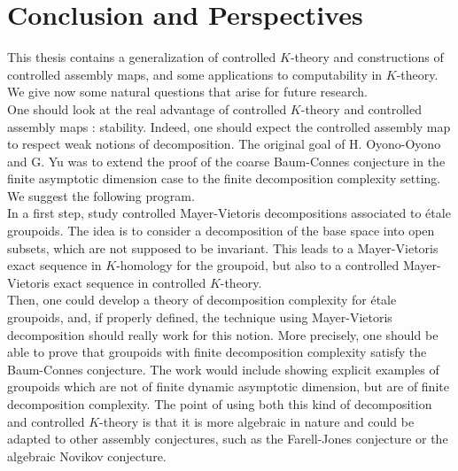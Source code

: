 \chapter{Conclusion and Perspectives}

This thesis contains a generalization of controlled $K$-theory and constructions of controlled assembly maps, and some applications to computability in $K$-theory. We give now some natural questions that arise for future research.\\ 

One should look at the real advantage of controlled $K$-theory and controlled assembly maps : stability. Indeed, one should expect the controlled assembly map to respect weak notions of decomposition. The original goal of H. Oyono-Oyono and G. Yu was to extend the proof of the coarse Baum-Connes conjecture in the finite asymptotic dimension case to the finite decomposition complexity setting. We suggest the following program.\\
 

In a first step, study controlled Mayer-Vietoris decompositions associated to étale groupoids. The idea is to consider a decomposition of the base space into open subsets, which are not supposed to be invariant. This leads to a Mayer-Vietoris exact sequence in $K$-homology for the groupoid, but also to a controlled Mayer-Vietoris exact sequence in controlled $K$-theory. \\

Then, one could develop a theory of decomposition complexity for étale groupoids, and, if properly defined, the technique using Mayer-Vietoris decomposition should really work for this notion. More precisely, one should be able to prove that groupoids with finite decomposition complexity satisfy the Baum-Connes conjecture. The work would include showing explicit examples of groupoids which are not of finite dynamic asymptotic dimension, but are of finite decomposition complexity. The point of using both this kind of decomposition and controlled $K$-theory is that it is more algebraic in nature and could be adapted to other assembly conjectures, such as the Farell-Jones conjecture or the algebraic Novikov conjecture. \cite{RTY} \\

